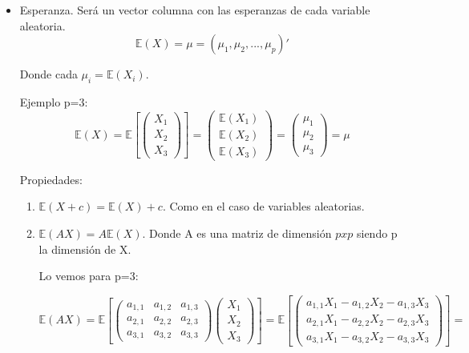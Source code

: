\documentclass[nochap]{apuntes}
\begin{document}
\begin{itemize}
\item Esperanza. Será un vector columna con las esperanzas de cada variable aleatoria.
\[
\mathbb{E}(X) = \mu = (\mu_1, \mu_2,..., \mu_p)'
\]

Donde cada $\mu_i = \mathbb{E}(X_i)$.

Ejemplo p=3:
\[
\mathbb{E}(X)=
\mathbb{E}\left[
\left(
\begin{array}{c}
X_1\\
X_2\\
X_3
\end{array}
\right)
\right]=
\left(
\begin{array}{c}
\mathbb{E}(X_1)\\
\mathbb{E}(X_2)\\
\mathbb{E}(X_3)
\end{array}
\right)=
\left(
\begin{array}{c}
\mu_1\\
\mu_2\\
\mu_3
\end{array}
\right)=
\mu
\]

Propiedades:
\begin{enumerate}
\item $\mathbb{E}(X+c) = \mathbb{E}(X)+c$. Como en el caso de variables aleatorias.
\item $\mathbb{E}(AX) = A\mathbb{E}(X)$. Donde A es una matriz de dimensión $pxp$ siendo p la dimensión de X.

Lo vemos para p=3:

\[
\mathbb{E}(AX)=
\mathbb{E}\left[
\left(
\begin{array}{ccc}
a_{1,1}& a_{1,2}& a_{1,3}\\
a_{2,1}& a_{2,2}& a_{2,3}\\
a_{3,1}& a_{3,2}& a_{3,3}
\end{array}
\right)
\left(
\begin{array}{c}
X_1\\
X_2\\
X_3
\end{array}
\right) \right]=
\mathbb{E}\left[
\left(
\begin{array}{c}
a_{1,1}X_1 - a_{1,2}X_2 - a_{1,3}X_3\\
a_{2,1}X_1 - a_{2,2}X_2 - a_{2,3}X_3\\
a_{3,1}X_1 - a_{3,2}X_2 - a_{3,3}X_3
\end{array}
\right)
\right]=
\]


\end{enumerate}
\end{itemize}
\end{document}
